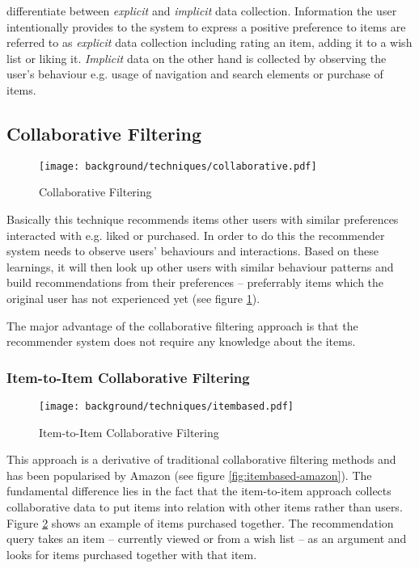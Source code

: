 \citet{anand03} differentiate between \textit{explicit} and \textit{implicit} data collection. Information the user intentionally provides to the system to express a positive preference to items are referred to as \textit{explicit} data collection including rating an item, adding it to a wish list or liking it. \textit{Implicit} data on the other hand is collected by observing the user's behaviour e.g. usage of navigation and search elements or purchase of items.

\subsection{Collaborative Filtering}
\label{bg-tech-collaborative}

\begin{figure}[ht]
    \texttt{[image: background/techniques/collaborative.pdf]}
    \caption{Collaborative Filtering}
    \label{fig:collaborative}
\end{figure}

Basically this technique recommends items other users with similar preferences interacted with e.g. liked or purchased. In order to do this the recommender system needs to observe users' behaviours and interactions. Based on these learnings, it will then look up other users with similar behaviour patterns and build recommendations from their preferences -- preferrably items which the original user has not experienced yet (see figure \ref{fig:collaborative}).

The major advantage of the collaborative filtering approach is that the recommender system does not require any knowledge about the items.

\subsubsection{Item-to-Item Collaborative Filtering}
\label{bg-tech-itembased}

\begin{figure}[ht]
    \texttt{[image: background/techniques/itembased.pdf]}
    \caption{Item-to-Item Collaborative Filtering}
    \label{fig:itembased}
\end{figure}

This approach is a derivative of traditional collaborative filtering methods and has been popularised by Amazon (see figure \ref{fig:itembased-amazon}). The fundamental difference lies in the fact that the item-to-item approach collects collaborative data to put items into relation with other items rather than users. Figure \ref{fig:itembased} shows an example of items purchased together. The recommendation query takes an item -- currently viewed or from a wish list -- as an argument and looks for items purchased together with that item.

